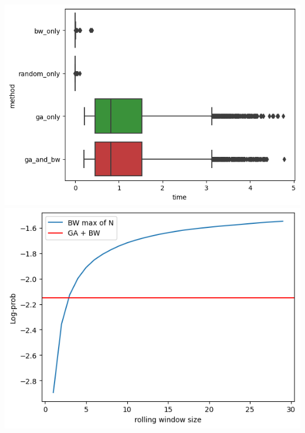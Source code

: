 \includegraphics[width=0.5\linewidth]{images/charts/slimane_execution_time.png}
\includegraphics[width=0.5\linewidth]{images/charts/slimane_rolling_window.png}






